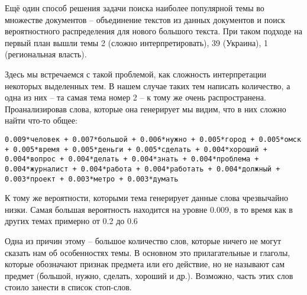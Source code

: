 Ещё один способ решения задачи поиска наиболее популярной темы во множестве документов -- объединение текстов из данных документов и поиск вероятностного распределения для нового большого текста. При таком подходе на первый план вышли темы 2 (сложно интерпретировать), 39 (Украина), 1 (региональная власть).

Здесь мы встречаемся с такой проблемой, как сложность интерпретации некоторых выделенных тем. В нашем случае таких тем {написать количество}, а одна из них -- та самая тема номер 2 -- к тому же очень распространена. Проанализировав слова, которые она генерирует мы видим, что в них сложно найти что-то общее:

\texttt{0.009*человек + 0.007*большой + 0.006*нужно + 0.005*город + 0.005*омск + 0.005*время + 0.005*деньги + 0.005*сделать + 0.004*хороший + 0.004*вопрос + 0.004*делать + 0.004*знать + 0.004*проблема + 0.004*журналист + 0.004*работа + 0.004*работать + 0.004*должный + 0.003*проект + 0.003*метро + 0.003*думать}

К тому же вероятности, которыми тема генерирует данные слова чрезвычайно низки. Самая большая вероятность находится на уровне 0.009, в то время как в других темах примерно от 0.2 до 0.6

Одна из причин этому -- большое количество слов, которые ничего не могут сказать нам об особенностях темы. В основном это прилагательные и глаголы, которые обозначают признак предмета или его действие, но не называют сам предмет (большой, нужно, сделать, хороший и др.). Возможно, часть этих слов стоило занести в список стоп-слов.

